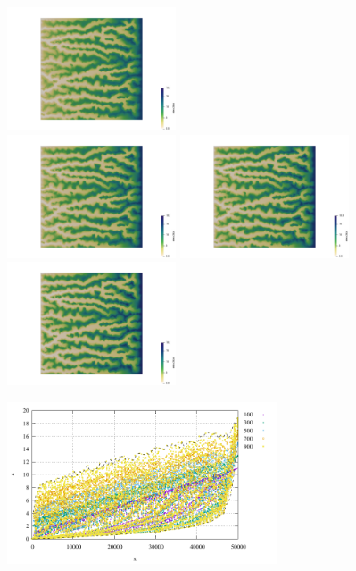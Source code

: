 \begin{center}
\includegraphics[width=5cm]{python_codes/fieldstone_140/results/exp1/elevation0010}\\
\includegraphics[width=5cm]{python_codes/fieldstone_140/results/exp1/elevation0012}
\includegraphics[width=5cm]{python_codes/fieldstone_140/results/exp1/elevation0014}
\includegraphics[width=5cm]{python_codes/fieldstone_140/results/exp1/elevation0016}
\end{center}

\begin{center}
\includegraphics[width=8cm]{python_codes/fieldstone_140/results/exp1/elevation}
\end{center}

